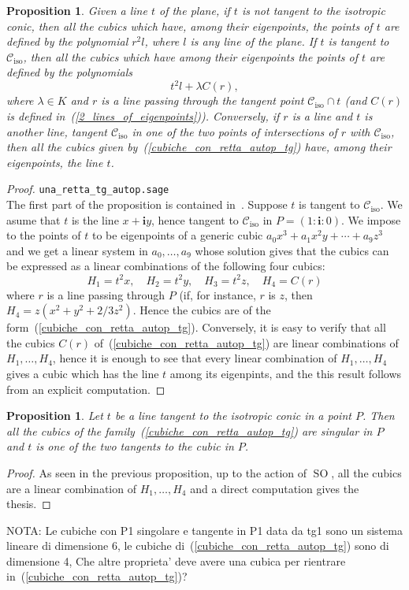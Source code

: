 \documentclass[11pt, a4paper, reqno, captions=tableheading,bibliography=totoc]{scrartcl}
\theoremstyle{plain}
\newtheorem{prop}[lemma]{Proposition}
\theoremstyle{definition}
\newcommand{\iso}{\mathcal{C}_{\mathrm{iso}}}
\newcommand{\SO}{\operatorname{SO}}
\newcommand{\iii}{\textbf{i}}
\begin{document}
\begin{prop}
Given a line $t$ of the plane, if $t$ is not tangent to the isotropic 
conic, then all the cubics which have, among their 
eigenpoints, the points of $t$ are defined by the polynomial $r^2l$,
where $l$ is any line of the plane. If $t$ is tangent to $\iso$, then
all the cubics which have among their eigenpoints the points of $t$ are
defined by the polynomials
\begin{equation}
\label{cubiche_con_retta_autop_tg}
t^2l+\lambda C(r),
\end{equation}
where $\lambda \in K$ and $r$ is a line
passing through the tangent point $\iso\cap t$ (and $C(r)$ is defined
in~(\ref{2_lines_of_eigenpoints})). Conversely, if $r$ is a line and
$t$ is another line, tangent $\iso$ in one of the two points of intersections
of $r$ with $\iso$, then all the cubics given
by~(\ref{cubiche_con_retta_autop_tg}) have, among their eigenpoints,
the line $t$.
\end{prop}
\begin{proof}
\verb+una_retta_tg_autop.sage+\\
The first part of the proposition is contained in~.
Suppose $t$ is tangent to $\iso$. We asume that $t$ is the line
$x+\iii y$, hence tangent to $\iso$ in $P = (1: \iii: 0)$.
We impose to the points
of $t$ to be eigenpoints of a generic cubic $a_0x^3+a_1x^2y+\cdots+a_9z^3$
and we get a linear system in $a_0, \dots, a_9$ whose solution gives that
the cubics can be expressed as a linear combinations of the following
four cubics:
\[
H_1 = t^2x, \quad H_2 = t^2y, \quad H_3 = t^2z, \quad H_4 = C(r)
\]
where $r$ is a line passing through $P$ (if, for instance, $r$
is $z$, then $H_4 = z(x^2 + y^2 + 2/3z^2)$. Hence the cubics are of the
form~(\ref{cubiche_con_retta_autop_tg}). Conversely, it is easy to verify
that all the cubics $C(r)$ of~(\ref{cubiche_con_retta_autop_tg}) are
linear combinations of $H_1, \dots, H_4$, hence it is enough
to see that every linear combination of $H_1, \dots, H_4$ gives a
cubic which has the line $t$ among its eigenpints, and the this result
follows from an explicit computation.
\end{proof}

\begin{prop}
Let $t$ be a line tangent to the isotropic conic in a point $P$. Then all the
cubics of the family~(\ref{cubiche_con_retta_autop_tg}) are singular in
$P$ and $t$ is one of the two tangents to the cubic in $P$. 
\end{prop}
\begin{proof}
As seen in the previous proposition, up to the action of $\SO$, all the 
cubics are a linear combination of $H_1, \dots, H_4$ and a direct
computation gives the thesis.
\end{proof}
NOTA: Le cubiche con P1 singolare e tangente in P1 data da tg1 sono
un sistema lineare di dimensione 6, le cubiche
di~(\ref{cubiche_con_retta_autop_tg}) sono di dimensione
4, Che altre proprieta' deve avere una cubica per rientrare
in~(\ref{cubiche_con_retta_autop_tg})?
\end{document}
